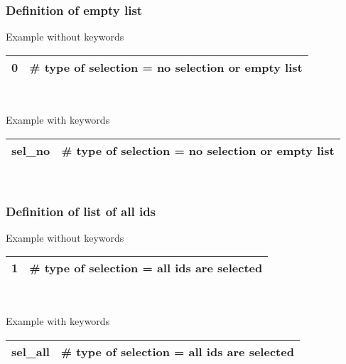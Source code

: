 \subsubsection{Definition of empty list}
Example without keywords
\begin{center}
\begin{tabular}{|ll|}
\hline
0 & \# type of selection = no selection or empty list
\\ \hline
\end{tabular}\\
\end{center}
Example with keywords
\begin{center}
\begin{tabular}{|ll|}
\hline
sel\_no & \# type of selection = no selection or empty list
\\ \hline
\end{tabular}\\
\end{center}



\subsubsection{Definition of list of all ids}
Example without keywords
\begin{center}
\begin{tabular}{|ll|}
\hline
1 & \# type of selection = all ids are selected
\\ \hline
\end{tabular}\\
\end{center}
Example with keywords
\begin{center}
\begin{tabular}{|ll|}
\hline
sel\_all & \# type of selection = all ids are selected
\\ \hline
\end{tabular}\\
\end{center}




